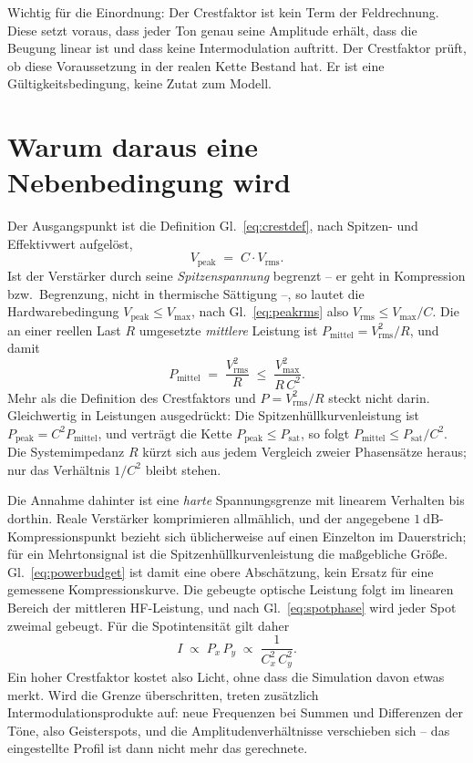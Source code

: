 \documentclass[11pt,a4paper]{article}
\newcommand{\crest}{\ensuremath{C}}
\begin{document}
Wichtig für die Einordnung: Der Crestfaktor ist kein Term der Feldrechnung.
Diese setzt voraus, dass jeder Ton genau seine Amplitude erhält, dass die
Beugung linear ist und dass keine Intermodulation auftritt. Der Crestfaktor
prüft, ob diese Voraussetzung in der realen Kette Bestand hat. Er ist eine
Gültigkeitsbedingung, keine Zutat zum Modell.

\section{Warum daraus eine Nebenbedingung wird}

Der Ausgangspunkt ist die Definition Gl.~\eqref{eq:crestdef}, nach Spitzen-
und Effektivwert aufgelöst,
\begin{equation}
  V_\mathrm{peak} \;=\; \crest \cdot V_\mathrm{rms} .
  \label{eq:peakrms}
\end{equation}
Ist der Verstärker durch seine \emph{Spitzenspannung} begrenzt -- er geht in
Kompression bzw.\ Begrenzung, nicht in thermische Sättigung --, so lautet die
Hardwarebedingung $V_\mathrm{peak}\le V_{\max}$, nach
Gl.~\eqref{eq:peakrms} also $V_\mathrm{rms}\le V_{\max}/\crest$. Die an einer
reellen Last $R$ umgesetzte \emph{mittlere} Leistung ist
$P_\mathrm{mittel}=V_\mathrm{rms}^2/R$, und damit
\begin{equation}
  P_\mathrm{mittel} \;=\; \frac{V_\mathrm{rms}^{2}}{R}
  \;\le\; \frac{V_{\max}^2}{R\,\crest^{2}} .
  \label{eq:powerbudget}
\end{equation}
Mehr als die Definition des Crestfaktors und $P=V_\mathrm{rms}^2/R$ steckt
nicht darin. Gleichwertig in Leistungen ausgedrückt: Die
Spitzenhüllkurvenleistung ist $P_\mathrm{peak}=\crest^{2}P_\mathrm{mittel}$,
und verträgt die Kette $P_\mathrm{peak}\le P_\mathrm{sat}$, so folgt
$P_\mathrm{mittel}\le P_\mathrm{sat}/\crest^{2}$. Die Systemimpedanz $R$
kürzt sich aus jedem Vergleich zweier Phasensätze heraus; nur das Verhältnis
$1/\crest^{2}$ bleibt stehen.

Die Annahme dahinter ist eine \emph{harte} Spannungsgrenze mit linearem
Verhalten bis dorthin. Reale Verstärker komprimieren allmählich, und der
angegebene $\SI{1}{\deci\bel}$-Kompressionspunkt bezieht sich üblicherweise
auf einen Einzelton im Dauerstrich; für ein Mehrtonsignal ist die
Spitzenhüllkurvenleistung die maßgebliche Größe. Gl.~\eqref{eq:powerbudget}
ist damit eine obere Abschätzung, kein Ersatz für eine gemessene
Kompressionskurve.
Die gebeugte optische Leistung folgt im linearen Bereich der mittleren
HF-Leistung, und nach Gl.~\eqref{eq:spotphase} wird jeder Spot zweimal
gebeugt. Für die Spotintensität gilt daher
\begin{equation}
  I \;\propto\; P_x\,P_y \;\propto\; \frac{1}{\crest_x^{2}\,\crest_y^{2}} .
  \label{eq:intensity}
\end{equation}
Ein hoher Crestfaktor kostet also Licht, ohne dass die Simulation davon etwas
merkt. Wird die Grenze überschritten, treten zusätzlich
Intermodulationsprodukte auf: neue Frequenzen bei Summen und Differenzen der
Töne, also Geisterspots, und die Amplitudenverhältnisse verschieben sich --
das eingestellte Profil ist dann nicht mehr das gerechnete.
\end{document}
